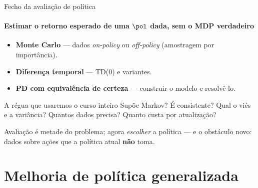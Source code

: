 \documentclass[aspectratio=169, 11pt]{beamer}
\begin{document}
\begin{frame}{Fecho da avaliação de política}
  \framesubtitle{Estimar o retorno esperado de uma $\pol$ dada, sem o MDP verdadeiro}

  \begin{itemize}\setlength{\itemsep}{0.4ex}
    \item \textbf{Monte Carlo} — dados \emph{on-policy} ou \emph{off-policy}
      (amostragem por importância).
    \item \textbf{Diferença temporal} — TD(0) e variantes.
    \item \textbf{PD com equivalência de certeza} — construir o modelo e
      resolvê-lo.
  \end{itemize}

  \vspace{-0.4em}
  \begin{defbox}{A régua que usaremos o curso inteiro}
    Supõe Markov? \; É consistente? \; Qual o viés e a variância? \;
    Quantos dados precisa? \; Quanto custa por atualização?
  \end{defbox}

  \begin{ideiabox}
    Avaliação é metade do problema; agora \emph{escolher} a política — e o
    obstáculo novo: dados sobre ações que a política atual \textbf{não}
    toma.
  \end{ideiabox}
\end{frame}

\section{Melhoria de política generalizada}
\end{document}
